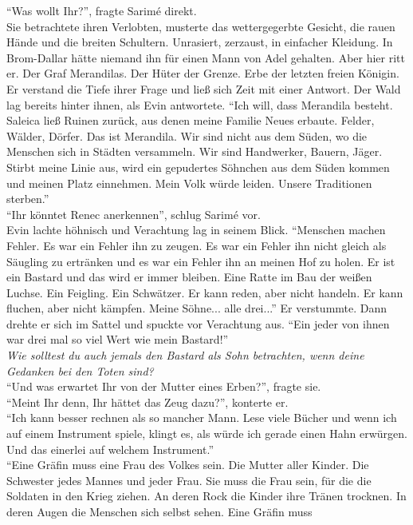 ``Was wollt Ihr?'', fragte Sarimé direkt.\\
Sie betrachtete ihren Verlobten, musterte das wettergegerbte Gesicht, die rauen Hände und die 
breiten Schultern. Unrasiert, zerzaust, in einfacher Kleidung. In Brom-Dallar hätte niemand ihn für 
einen Mann von Adel gehalten. Aber hier ritt er. Der Graf Merandilas. Der Hüter der Grenze. Erbe 
der letzten freien Königin.\\
Er verstand die Tiefe ihrer Frage und ließ sich Zeit mit einer Antwort. Der Wald lag bereits hinter 
ihnen, als Evin antwortete. ``Ich will, dass Merandila besteht. Saleica ließ Ruinen zurück, aus 
denen meine Familie Neues erbaute. Felder, Wälder, Dörfer. Das ist Merandila. Wir sind nicht aus 
dem Süden, wo die Menschen sich in Städten versammeln. Wir sind Handwerker, Bauern, Jäger. Stirbt 
meine Linie aus, wird ein gepudertes Söhnchen aus dem Süden kommen und meinen Platz einnehmen. Mein 
Volk würde leiden. Unsere Traditionen sterben.''\\
``Ihr könntet Renec anerkennen'', schlug Sarimé vor.\\
Evin lachte höhnisch und Verachtung lag in seinem Blick. ``Menschen machen Fehler. Es war ein 
Fehler ihn zu zeugen. Es war ein Fehler ihn nicht gleich als Säugling zu ertränken und es war ein 
Fehler ihn an meinen Hof zu holen. Er ist ein Bastard und das wird er immer bleiben. Eine Ratte im 
Bau der weißen Luchse. Ein Feigling. Ein Schwätzer. Er kann reden, aber nicht handeln. Er kann 
fluchen, aber nicht kämpfen. Meine Söhne... alle drei...'' Er verstummte. Dann drehte er sich im 
Sattel und spuckte vor Verachtung aus. ``Ein jeder von ihnen war drei mal so viel Wert wie mein 
Bastard!''\\
\textit{Wie solltest du auch jemals den Bastard als Sohn betrachten, wenn deine Gedanken bei den 
Toten sind?}\\
``Und was erwartet Ihr von der Mutter eines Erben?'', fragte sie.\\
``Meint Ihr denn, Ihr hättet das Zeug dazu?'', konterte er.\\
``Ich kann besser rechnen als so mancher Mann. Lese viele Bücher und wenn ich auf einem Instrument 
spiele, klingt es, als würde ich gerade einen Hahn erwürgen. Und das einerlei auf welchem 
Instrument.''\\
``Eine Gräfin muss eine Frau des Volkes sein. Die Mutter aller Kinder. Die Schwester jedes Mannes 
und jeder Frau. Sie muss die Frau sein, für die die Soldaten in den Krieg ziehen. An deren Rock 
die Kinder ihre Tränen trocknen. In deren Augen die Menschen sich selbst sehen. Eine Gräfin muss 
